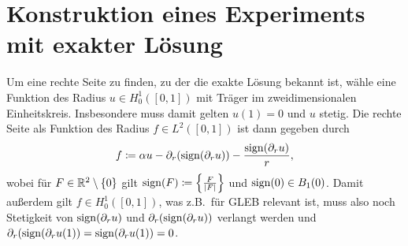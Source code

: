 \section{Konstruktion eines Experiments mit exakter Lösung}
Um eine rechte Seite zu finden, zu der die exakte Lösung bekannt
ist, wähle eine Funktion des Radius $u\in H^1_0([0,1])$ mit Träger im 
zweidimensionalen Einheitskreis. Insbesondere muss damit gelten $u(1)=0$ und
$u$ stetig.
Die rechte Seite als Funktion des Radius $f\in L^2([0,1])$ ist dann gegeben
durch 
\begin{align*}
  f \coloneqq 
  \alpha u - \partial_r(\operatorname{sign}(\partial_r u)) - \frac{\operatorname{sign}(\partial_r u)}{r},
\end{align*}
wobei für $F\in\mathbb{R}^2\setminus\{0\}$ gilt 
$\operatorname{sign}(F)\coloneqq \left\{\frac{F}{|F|}\right\}$ 
und $\operatorname{sign}(0)\in B_1(0)$.
Damit außerdem gilt $f\in H^1_0([0,1])$, was z.B.\ für GLEB relevant ist, 
muss also noch Stetigkeit von $\operatorname{sign}(\partial_r u)$ und 
$\partial_r(\operatorname{sign}(\partial_r u))$ verlangt werden und 
$\partial_r(\operatorname{sign}(\partial_r u(1))=\operatorname{sign}(\partial_r u(1))=0$.

